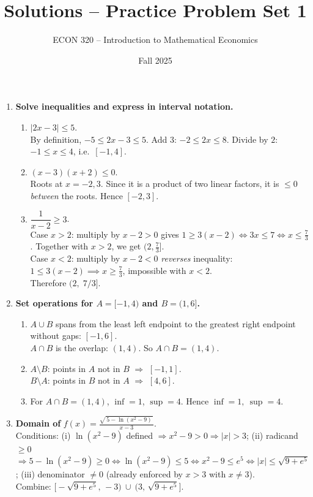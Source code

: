 \documentclass[12pt]{article}
\title{Solutions -- Practice Problem Set 1}
\author{ECON 320 -- Introduction to Mathematical Economics}
\date{Fall 2025}
\begin{document}
\maketitle




\begin{enumerate}
\item \textbf{Solve inequalities and express in interval notation.}
\begin{enumerate}[label=(\alph*)]
  \item $\lvert 2x-3\rvert \le 5$.\\
  By definition, $-5\le 2x-3\le 5$. Add $3$: $-2\le 2x\le 8$. Divide by $2$: $\boxed{-1\le x\le 4}$, i.e.\ $\boxed{[-1,4]}$.

  \item $(x-3)(x+2)\le 0$.\\
  Roots at $x=-2,3$. Since it is a product of two linear factors, it is $\le0$ \emph{between} the roots. Hence $\boxed{[-2,3]}$.

  \item $\dfrac{1}{x-2}\ge 3$.\\
  Case $x>2$: multiply by $x-2>0$ gives $1\ge 3(x-2)\iff 3x\le 7\iff x\le \tfrac{7}{3}$. Together with $x>2$, we get $(2,\tfrac{7}{3}]$.\\
  Case $x<2$: multiply by $x-2<0$ \emph{reverses} inequality: $1\le 3(x-2)\implies x\ge \tfrac{7}{3}$, impossible with $x<2$.\\
  Therefore $\boxed{(2,\;7/3]}$.
\end{enumerate}

\item \textbf{Set operations for $A=[-1,4)$ and $B=(1,6]$.}
\begin{enumerate}[label=(\alph*)]
  \item $A\cup B$ spans from the least left endpoint to the greatest right endpoint without gaps: $\boxed{[-1,6]}$.\\
        $A\cap B$ is the overlap: $(1,4)$. So $\boxed{A\cap B=(1,4)}$.
  \item $A\setminus B$: points in $A$ not in $B$ $\Rightarrow$ $\boxed{[-1,1]}$.\\
        $B\setminus A$: points in $B$ not in $A$ $\Rightarrow$ $\boxed{[4,6]}$.
  \item For $A\cap B=(1,4)$, $\inf=1$, $\sup=4$. Hence $\boxed{\inf=1,\ \sup=4}$.
\end{enumerate}

\item \textbf{Domain of} $\displaystyle f(x)=\frac{\sqrt{\,5-\ln(x^{2}-9)\,}}{x-3}$.\\
Conditions: (i) $\ln(x^2-9)$ defined $\Rightarrow x^2-9>0\Rightarrow |x|>3$; (ii) radicand $\ge0$ $\Rightarrow 5-\ln(x^2-9)\ge0\iff \ln(x^2-9)\le 5\iff x^2-9\le e^5\iff |x|\le \sqrt{9+e^5}$; (iii) denominator $\neq 0$ (already enforced by $x>3$ with $x\ne 3$).\\
Combine: $\boxed{\big[-\sqrt{9+e^5},\,-3\big)\ \cup\ \big(3,\,\sqrt{9+e^5}\big]}$.


\end{enumerate}
\end{document}
